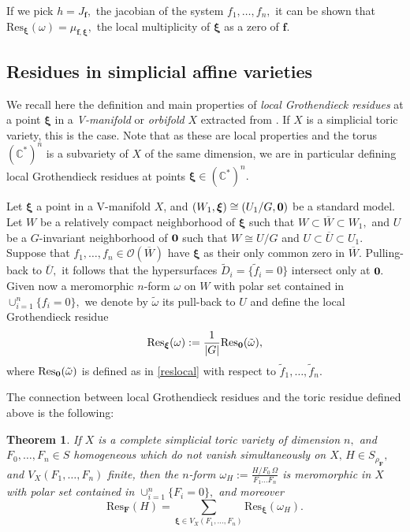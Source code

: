 \documentclass[a4paper,11pt]{amsart}
\newcommand{\C}{\mathbb{C}}
\newcommand{\cO}{{\mathcal O}}
\newcommand{\bff}{{\boldsymbol{f}}}
\newcommand{\bfF}{{\boldsymbol{F}}}
\newcommand{\bfxi}{{\boldsymbol{\xi}}}
\newcounter{thm}
\numberwithin{thm}{section}
\numberwithin{equation}{section}
\theoremstyle{definition}
\theoremstyle{plain}
\newtheorem{theorem}[thm]{Theorem}
\begin{document}
If we pick $h= J_\bff,$ the jacobian of the system $f_1,\ldots, f_n,$ it can be shown that $\mbox{Res}_\bfxi(\omega)=\mu_{\bff,\bfxi},$ the local multiplicity of $\bfxi$ as a zero of $\bff.$ 




\medskip
\subsection{Residues in simplicial affine varieties }\label{groth}
We recall here the definition and main properties of \textit{local Grothendieck residues} at a point $\bfxi$ in a \textit{V-manifold} or \textit{orbifold} $X$ extracted from \cite[\S 4]{CCD97}. If $X$ is a simplicial toric variety, this is the case.  Note that as these are local properties and the torus $(\C^*)^n$ is a subvariety of $X$ of the same dimension, we are in particular defining local Grothendieck residues at points $\bfxi\in (\C^*)^n.$


Let $\bfxi$ a point in a V-manifold $X$, and   $(W_1, \bfxi)\cong (U_1/G,{\bf 0})$  be a standard model. Let $W$ be a relatively compact neighborhood of $\bfxi$ such that 
$W\subset\overline{W}\subset W_1,$ and $U$ be a $G$-invariant neighborhood of ${\bf0}$ such that $W\cong U/G$ and $U\subset\overline{U}\subset U_1.$ Suppose that
$f_1,\ldots ,f_n \in\cO(\overline{W})$ have $\bfxi$ as their only common zero in $\overline{W}.$ Pulling-back to $\overline{U},$ it follows 
that the hypersurfaces $\tilde{D}_i = \{\tilde{f}_i = 0\}$ intersect only at ${\bf0}.$ Given now a meromorphic $n$-form $\omega$ on $W$ with polar set contained in $\cup_{i=1}^n \{f_i = 0\},$ we denote by $\tilde{\omega}$ its pull-back to $U$ and define the local Grothendieck residue 
\begin{equation}\label{rloc}
\mbox{Res}_\bfxi(\omega):=\frac{1}{|G|}\mbox{Res}_{\bf0}(\tilde{\omega}),
\end{equation}
where
$\mbox{Res}_{\bf0}(\tilde{\omega})$ is defined as in \eqref{reslocal}  with respect to $\tilde{f}_1,\ldots, \tilde{f}_n.$


The connection between local Grothendieck residues and the toric residue defined above is the following:
\begin{theorem}\cite[Theorem 0.4]{CCD97}\label{gloc}
If $X$ is a complete simplicial toric variety of dimension $n,$ and $F_0,\ldots, F_n\in S$ homogeneous which do not vanish simultaneously on $X,\, H\in S_{\rho_\bfF},$ and 
$V_X(F_1,\ldots, F_n)$ finite, then the $n$-form $\omega_H:=\frac{H/F_0\,\Omega}{F_1\ldots F_n }$ is meromorphic  in $X$ with polar set contained in $\cup_{i=1}^n \{F_i = 0\},$ and moreover
$$\mbox{Res}_\bfF(H)=\sum_{\bfxi\in V_X(F_1,\ldots, F_n)}\mbox{Res}_\bfxi(\omega_H).
$$
\end{theorem}
\end{document}
